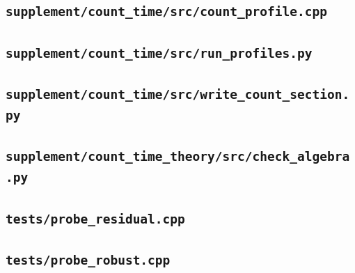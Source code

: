 \subsection*{\texttt{supplement/count\_time/src/count\_profile.cpp}}

\subsection*{\texttt{supplement/count\_time/src/run\_profiles.py}}

\subsection*{\texttt{supplement/count\_time/src/write\_count\_section.py}}

\subsection*{\texttt{supplement/count\_time\_theory/src/check\_algebra.py}}

\subsection*{\texttt{tests/probe\_residual.cpp}}

\subsection*{\texttt{tests/probe\_robust.cpp}}

